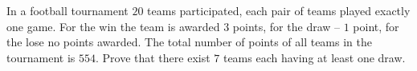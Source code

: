 In a football tournament $20$ teams participated, each pair of teams played exactly one game. For the win the team is awarded $3$ points, for the draw -- $1$ point, for the lose no points awarded. The total number of points of all teams in the tournament is $554$. Prove that there exist $7$ teams each having at least one draw.